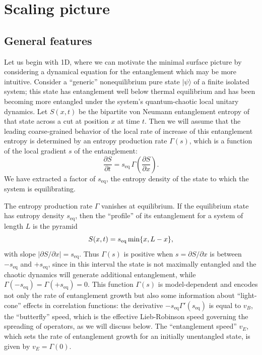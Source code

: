 \documentclass[aps,prx,twocolumn,superscriptaddress,floatfix,nofootinbib,prx]{revtex4}
\renewcommand{\>}{\right\rangle}
\newcommand{\<}{\left\langle}
\newcommand{\be}{\begin{equation}}
\newcommand{\ee}{\end{equation}}
\newcommand{\lf}{\left(}
\newcommand{\ri}{\right)}
\newcommand{\seq}{s_\text{eq}}
\begin{document}
\tableofcontents


\section{Scaling picture}
\label{scaling_picture_section}
%
\subsection{General features}

Let us begin with 1D, where we can motivate the minimal surface picture by considering a dynamical equation for the entanglement which may be more intuitive.  Consider a ``generic'' nonequilibrium pure state $|\psi\rangle$ of a finite isolated system; this state has entanglement well below thermal equilibrium and has been becoming more entangled under the system's quantum-chaotic local unitary dynamics.  Let $S(x,t)$ be the bipartite von Neumann entanglement entropy of that state across a cut at position $x$ at time $t$.  Then we will assume that the leading coarse-grained behavior of the local rate of increase of this entanglement entropy 
is determined by an entropy production rate $\Gamma(s)$, which is a function of the local gradient $s$ of the entanglement:
\begin{equation}
    \frac{\partial S}{\partial t} = \seq \, \Gamma\lf \frac{\partial S}{\partial x}\ri.
    \label{eq:state}
\end{equation}
We have  extracted a factor of $\seq$, the  entropy density of the state to which the system is equilibrating.  

The entropy production rate $\Gamma$ vanishes at equilibrium. If the equilibrium state has entropy density $\seq$, then the ``profile'' of its entanglement for a system of length $L$ is the pyramid 
\be
S(x,t)=\seq \, {\rm min}\{x, L-x\},
\ee
with slope $|\partial S/\partial x|= \seq$.  Thus $\Gamma(s)$ is positive when ${s=\partial S/\partial x}$ is between $-\seq$ and $+\seq$, since in this interval the state is not maximally entangled and the chaotic dynamics will generate additional entanglement, while $\Gamma(-\seq)=\Gamma(+\seq)=0$.  This function $\Gamma(s)$ is model-dependent and encodes not only the rate of entanglement growth but also some information about ``light-cone'' effects in correlation functions: the derivative $-\seq \Gamma'(\seq)$ is equal to $v_B$, the ``butterfly'' speed, which is the effective Lieb-Robinson \cite{lr} speed
 governing the spreading of operators, as we will discuss below.  The ``entanglement speed'' $v_E$, which sets the rate of entanglement growth for an initially unentangled state, is given by $v_E = \Gamma(0)$.
\end{document}
